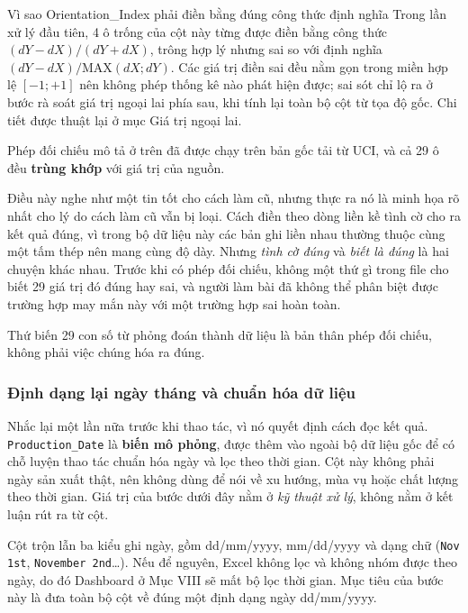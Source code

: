 \documentclass[12pt]{article}
\begin{document}
\begin{guidelinebox}{Vì sao Orientation\_Index phải điền bằng đúng công thức định nghĩa}
Trong lần xử lý đầu tiên, 4 ô trống của cột này từng được điền bằng công thức $(dY-dX)/(dY+dX)$, trông hợp lý nhưng sai so với định nghĩa $(dY-dX)/\mathrm{MAX}(dX; dY)$. Các giá trị điền sai đều nằm gọn trong miền hợp lệ $[-1; +1]$ nên không phép thống kê nào phát hiện được; sai sót chỉ lộ ra ở bước rà soát giá trị ngoại lai phía sau, khi tính lại toàn bộ cột từ tọa độ gốc. Chi tiết được thuật lại ở mục Giá trị ngoại lai.
\end{guidelinebox}

\begin{notebox}[title=\faInfoCircle~\textbf{Kết quả đối chiếu 29 ô độ dày, và một bài học kèm theo}]
Phép đối chiếu mô tả ở trên đã được chạy trên bản gốc tải từ UCI, và cả 29 ô đều \textbf{trùng khớp} với giá trị của nguồn.

Điều này nghe như một tin tốt cho cách làm cũ, nhưng thực ra nó là minh họa rõ nhất cho lý do cách làm cũ vẫn bị loại. Cách điền theo dòng liền kề tình cờ cho ra kết quả đúng, vì trong bộ dữ liệu này các bản ghi liền nhau thường thuộc cùng một tấm thép nên mang cùng độ dày. Nhưng \emph{tình cờ đúng} và \emph{biết là đúng} là hai chuyện khác nhau. Trước khi có phép đối chiếu, không một thứ gì trong file cho biết 29 giá trị đó đúng hay sai, và người làm bài đã không thể phân biệt được trường hợp may mắn này với một trường hợp sai hoàn toàn.

Thứ biến 29 con số từ phỏng đoán thành dữ liệu là bản thân phép đối chiếu, không phải việc chúng hóa ra đúng.
\end{notebox}

\subsubsection{Định dạng lại ngày tháng và chuẩn hóa dữ liệu}

Nhắc lại một lần nữa trước khi thao tác, vì nó quyết định cách đọc kết quả. \texttt{Production\_Date} là \textbf{biến mô phỏng}, được thêm vào ngoài bộ dữ liệu gốc để có chỗ luyện thao tác chuẩn hóa ngày và lọc theo thời gian. Cột này không phải ngày sản xuất thật, nên không dùng để nói về xu hướng, mùa vụ hoặc chất lượng theo thời gian. Giá trị của bước dưới đây nằm ở \emph{kỹ thuật xử lý}, không nằm ở kết luận rút ra từ cột.

\noindent
Cột trộn lẫn ba kiểu ghi ngày, gồm dd/mm/yyyy, mm/dd/yyyy và dạng chữ (\texttt{Nov 1st}, \texttt{November 2nd}\ldots). Nếu để nguyên, Excel không lọc và không nhóm được theo ngày, do đó Dashboard ở Mục VIII sẽ mất bộ lọc thời gian. Mục tiêu của bước này là đưa toàn bộ cột về đúng một định dạng ngày dd/mm/yyyy.
\end{document}
